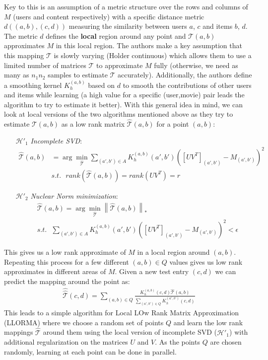 \documentclass[10 pt,table]{article}  %
\begin{document}
Key to this is an assumption of a metric structure over the rows and columns of $M$ (users and content respectively) with a specific distance metric $d((a,b),(c,d))$ measuring the similarity between users $a$, $c$ and items $b$, $d$. The metric $d$ defines the \textbf{local} region around any point and $\mathcal{T}(a,b)$ approximates $M$ in this local region. The authors make a key assumption that this mapping $\mathcal{T}$ is slowly varying (Holder continuous) which allows them to use a limited number of matrices $\mathcal{T}$ to approximate $M$ fully (otherwise, we need as many as $n_1n_2$ samples to estimate $\mathcal{T}$ accurately). Additionally, the authors define a smoothing kernel $K_h^{(a,b)}$ based on $d$ to smooth the contributions of other users and items while learning (a high value for a specific (user,movie) pair leads the algorithm to try to estimate it better). With this general idea in mind, we can look at local versions of the two algorithms mentioned above as they try to estimate $\mathcal{T}(a,b)$ as a low rank matrix $\hat{\mathcal{T}}(a,b)$ for a point $(a,b)$:
\begin{itemize}
\item[$\mathcal{H'}_1$] \emph{Incomplete SVD}: 
\vspace{-2mm} \begin{align}
 \hat{\mathcal{T}}(a,b) &= \arg \min_{\hat{\mathcal{T}}} \sum_{(a',b') \in A} K_h^{(a,b)}(a',b') \left([UV^T]_{(a',b')} - M_{(a',b')}\right)^2 \\
&s.t. \ \ \ rank(\hat{\mathcal{T}}(a,b)) = rank(UV^T) = r
\end{align} 
\item[$\mathcal{H'}_2$] \emph{Nuclear Norm minimization}:
\vspace{-2mm} \begin{align}
&\hat{\mathcal{T}}(a,b) = \arg \min_{\hat{\mathcal{T}}} \left\| \hat{\mathcal{T}}(a,b) \right\|_* \\
&s.t. \ \ \ \sum_{(a',b') \in A} K_h^{(a,b)}(a',b') \left([UV^T]_{(a',b')} - M_{(a',b')}\right)^2 < \epsilon
\end{align}
\end{itemize}
This gives us a low rank approximate of $M$ in a local region around $(a,b)$. Repeating this process for a few different $(a,b) \in Q$ values gives us low rank approximates in different areas of $M$. Given a new test entry $(c,d)$ we can predict the mapping around the point as:
\vspace{-2mm}\begin{align}
\hat{\hat{\mathcal{T}}}(c,d) = \sum_{(a,b) \in Q} \frac{K_h^{(a,b)}(c,d) \hat{\mathcal{T}}(a,b)}{\sum_{(a',b') \in Q} K_h^{(a',b')}(c,d)}
\end{align}
This leads to a simple algorithm for Local LOw Rank Matrix Approximation (LLORMA) where we choose a random set of points $Q$ and learn the low rank mappings $\hat{\mathcal{T}}$ around them using the local version of incomplete SVD ($\mathcal{H'}_1$) with additional regularization on the matrices $U$ and $V$. As the points $Q$ are chosen randomly, learning at each point can be done in parallel. 
\end{document}

